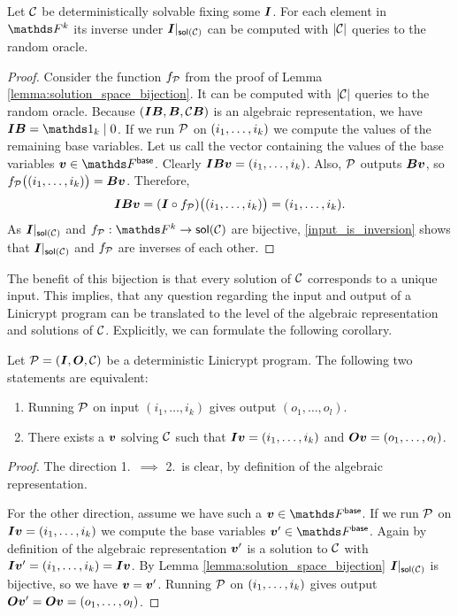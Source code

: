 \begin{corollary}
\label{det_solvable_computeable}
    Let $\C$ be deterministically solvable fixing some $\I$.
    For each element in $\F^k$ its inverse under $\I|_{\sol(\C)}$ can be computed with $|\C|$ queries to the random oracle.
\end{corollary}

\begin{proof}
    Consider the function $f_\P$ from the proof of Lemma \ref{lemma:solution_space_bijection}.
    It can be computed with $|\C|$ queries to the random oracle.
    Because $(\I\B, \B, \C\B)$ is an algebraic representation,
    we have $\I\B = \Id_k \mid 0$. 
    If we run $\P$ on $(\dts i k)$ we compute the values of the remaining base variables.
    Let us call the vector containing the values of the base variables $\vv \in \Fsp$.
    Clearly $\I\B \vv = (\dts i k)$.
    Also, $\P$ outputs $\B\vv$, so $f_\P\big((\dts i k)\big) = \B\vv$. 
    Therefore, 
    \begin{equation}
    \label{input_is_inversion}
    \I\B \vv = (\I \circ f_\P)\big((\dts i k)\big) = (\dts i k).
    \end{equation}
    As $\I|_{\sol(\C)}$ and $f_\P: \F^k \to \sol(\C)$ are bijective,
    \eqref{input_is_inversion} shows that $\I|_{\sol(\C)}$ and $f_\P$ are inverses of each other.
\end{proof}

The benefit of this bijection is that every solution of $\C$ corresponds to a unique input.
This implies, that any question regarding the input and output of a Linicrypt program can be translated to the level of the algebraic representation and solutions of $\C$.
Explicitly, we can formulate the following corollary.

\begin{corollary}
\label{det_solvable_equiv}
    Let $\P = (\I, \O, \C)$ be a deterministic Linicrypt program.
    The following two statements are equivalent:
    \begin{enumerate}
    \item
        Running $\P$ on input $(i_1, \dots, i_k)$ gives output $(o_1, \dots, o_l)$.
    \item 
        There exists a $\vv$ solving $\C$ such that
        $\I\vv = (\dts i k)$ and
        $\O\vv = (\dts o l)$.
    \end{enumerate}
\end{corollary}

\begin{proof}
    The direction 1.~$\implies$ 2.~is clear, by definition of the algebraic representation.
    
    For the other direction, assume we have such a $\vv \in \Base$.
    If we run $\P$ on $\I\vv = (\dts i k)$ we compute the base variables $\vv' \in \Base$.
    Again by definition of the algebraic representation $\vv'$ is a solution to $\C$ with $\I\vv' = (\dts i k) = \I\vv$.
    By Lemma \ref{lemma:solution_space_bijection} $\I|_{\sol(\C)}$ is bijective,
    so we have $\vv = \vv'$.
    Running $\P$ on $(\dts i k)$ gives output $\O\vv' = \O\vv = (\dts o l)$.
\end{proof}

